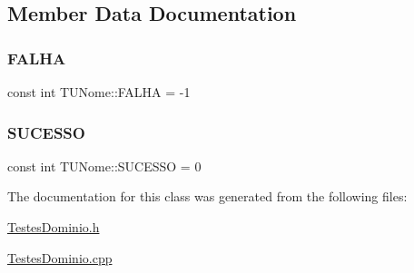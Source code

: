 \subsection{Member Data Documentation}
\mbox{\label{class_t_u_nome_a50bf8928bc5e773eaf15a2fb5eb2f065}} 
\subsubsection{\texorpdfstring{F\+A\+L\+HA}{FALHA}}
{\footnotesize\ttfamily const int T\+U\+Nome\+::\+F\+A\+L\+HA = -\/1\hspace{0.3cm}{\ttfamily [static]}}

\mbox{\label{class_t_u_nome_af1d3faa5a4f6a302f96d193478f3013b}} 
\subsubsection{\texorpdfstring{S\+U\+C\+E\+S\+SO}{SUCESSO}}
{\footnotesize\ttfamily const int T\+U\+Nome\+::\+S\+U\+C\+E\+S\+SO = 0\hspace{0.3cm}{\ttfamily [static]}}



The documentation for this class was generated from the following files\+:\begin{DoxyCompactItemize}
\item 
\hyperlink{_testes_dominio_8h}{Testes\+Dominio.\+h}\item 
\hyperlink{_testes_dominio_8cpp}{Testes\+Dominio.\+cpp}\end{DoxyCompactItemize}
